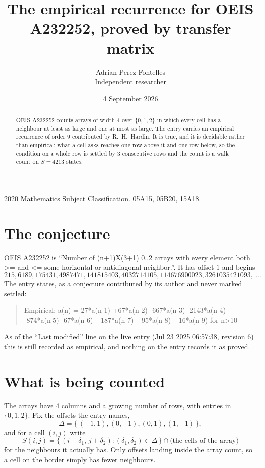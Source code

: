 \documentclass[11pt,a4paper]{article}
\title{The empirical recurrence for OEIS A232252, proved by transfer matrix}
\author{Adrian Perez Fontelles\\ \small Independent researcher}
\date{4 September 2026}
\theoremstyle{plain}
\theoremstyle{definition}
\begin{document}
\maketitle

\begin{abstract}
OEIS A232252 counts arrays of width $4$ over $\{0,1,2\}$ in which every cell has a neighbour at least as large and one at most as large. The entry carries an
empirical recurrence of order $9$ contributed by R.~H.~Hardin. It is true, and it is
decidable rather than empirical: what a cell asks reaches one row above it and one row below, so the
condition on a whole row is settled by $3$ consecutive rows and the count is a walk
count on $S=4213$ states.
\end{abstract}

\noindent\small 2020 Mathematics Subject Classification. 05A15, 05B20, 15A18.\normalsize

\section{The conjecture}

OEIS A232252 is ``Number of (n+1)X(3+1) 0..2 arrays with every element both >= and <= some horizontal or antidiagonal neighbor.''. It has offset $1$ and begins
\[
215, 6189, 175431, 4987471, 141815403, 4032714105, 114676900023, 3261035421093,\ \dots
\]
The entry states, as a conjecture contributed by its author and never marked settled:
\begin{quote}
Empirical: a(n) = 27*a(n-1) +67*a(n-2) -667*a(n-3) -2143*a(n-4) -874*a(n-5) -67*a(n-6) +187*a(n-7) +95*a(n-8) +16*a(n-9) for n>10
\end{quote}
As of the ``Last modified'' line on the live entry (Jul 23 2025 06:57:38, revision 6) this is still
recorded as empirical, and nothing on the entry records it as proved.

\section{What is being counted}

The arrays have $4$ columns and a growing number of rows, with entries in $\{0,1,2\}$. Fix the
offsets the entry names,
\[
\Delta=\{\,(-1,1), (0,-1), (0,1), (1,-1)\,\},
\]
and for a cell $(i,j)$ write
\[
S(i,j)=\{\,(i+\delta_1,\,j+\delta_2) : (\delta_1,\delta_2)\in\Delta\,\}\cap
\text{(the cells of the array)}
\]
for the neighbours it actually has. Only offsets landing inside the array count, so a cell on
the border simply has fewer neighbours.
\end{document}
